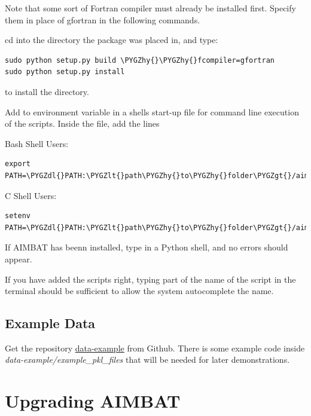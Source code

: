 \documentclass[letterpaper,10pt,english]{sphinxmanual}
\def\PYGZlt{\char`\<}
\def\PYGZgt{\char`\>}
\def\PYGZdl{\char`\$}
\def\PYGZhy{\char`\-}
\begin{document}
Note that some sort of Fortran compiler must already be installed first. Specify them in place of gfortran in the following commands.

cd into the directory the  package was placed in, and type:

\begin{Verbatim}[commandchars=\\\{\}]
sudo python setup.py build \PYGZhy{}\PYGZhy{}fcompiler=gfortran
sudo python setup.py install
\end{Verbatim}

to install the  directory.

Add  to environment variable  in a shells start-up file for command line execution of the scripts. Inside the  file, add the lines

Bash Shell Users:

\begin{Verbatim}[commandchars=\\\{\}]
export PATH=\PYGZdl{}PATH:\PYGZlt{}path\PYGZhy{}to\PYGZhy{}folder\PYGZgt{}/aimbat/scripts
\end{Verbatim}

C Shell Users:

\begin{Verbatim}[commandchars=\\\{\}]
setenv PATH=\PYGZdl{}PATH:\PYGZlt{}path\PYGZhy{}to\PYGZhy{}folder\PYGZgt{}/aimbat/scripts
\end{Verbatim}

If AIMBAT has beenn installed, type  in a Python shell, and no errors should appear.

If you have added the scripts right, typing part of the name of the script in the terminal should be sufficient to allow the system autocomplete the name.


\section{Example Data}
\label{docfiles/install_aimbat:example-data}
Get the repository \href{https://github.com/pysmo/data-example}{data-example} from Github. There is some example code inside \emph{data-example/example\_pkl\_files} that will be needed for later demonstrations.


\chapter{Upgrading AIMBAT}
\label{docfiles/upgrading_aimbat:upgrading-aimbat}\label{docfiles/upgrading_aimbat::doc}
\end{document}
